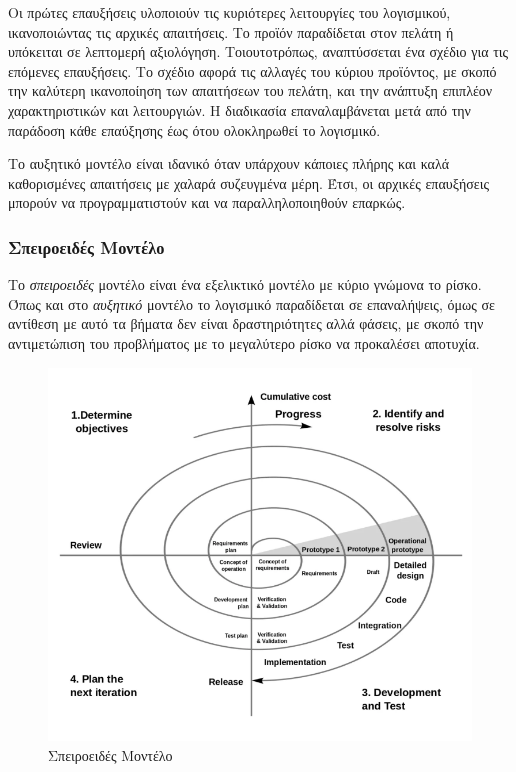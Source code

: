 \documentclass{report}
\begin{document}
Οι πρώτες επαυξήσεις υλοποιούν τις κυριότερες λειτουργίες του λογισμικού, ικανοποιώντας τις αρχικές απαιτήσεις. Το προϊόν παραδίδεται στον πελάτη ή υπόκειται σε λεπτομερή αξιολόγηση. Τοιουτοτρόπως, αναπτύσσεται ένα σχέδιο για τις επόμενες επαυξήσεις. Το σχέδιο αφορά τις αλλαγές του κύριου προϊόντος, με σκοπό την καλύτερη ικανοποίηση των απαιτήσεων του πελάτη, και την ανάπτυξη επιπλέον χαρακτηριστικών και λειτουργιών. Η διαδικασία επαναλαμβάνεται μετά από την παράδοση κάθε επαύξησης έως ότου ολοκληρωθεί το λογισμικό.

Το αυξητικό μοντέλο είναι ιδανικό όταν υπάρχουν κάποιες πλήρης και καλά καθορισμένες απαιτήσεις με χαλαρά συζευγμένα μέρη. Έτσι, οι αρχικές επαυξήσεις μπορούν να προγραμματιστούν και να παραλληλοποιηθούν επαρκώς.

\subsubsection{Σπειροειδές Μοντέλο}

Το \textsl{σπειροειδές} μοντέλο είναι ένα εξελικτικό μοντέλο με κύριο γνώμονα το ρίσκο. Όπως και στο \textsl{αυξητικό} μοντέλο το λογισμικό παραδίδεται σε επαναλήψεις, όμως σε αντίθεση με αυτό τα βήματα δεν είναι δραστηριότητες αλλά φάσεις, με σκοπό την αντιμετώπιση του προβλήματος με το μεγαλύτερο ρίσκο να προκαλέσει αποτυχία.

\begin{figure}[h]
    \centering
    \includegraphics[scale=2]{images/software_engineering/spiral_process_model.png}
    \caption{Σπειροειδές Μοντέλο}
    \label{fig:spiral_process_model}
\end{figure}
\end{document}
